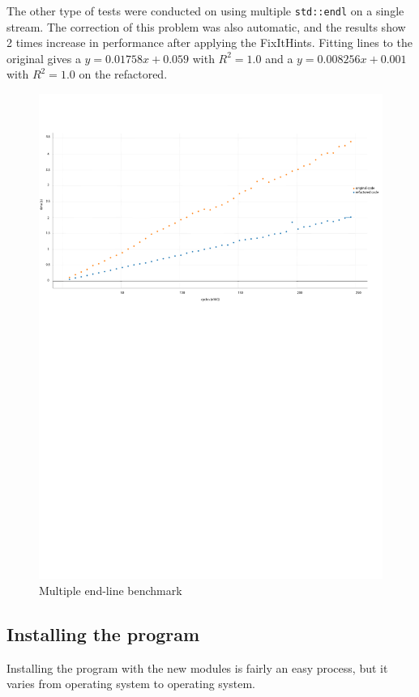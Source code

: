 \par The other type of tests were conducted on using multiple \verb|std::endl| on a single stream. The correction of this problem was also automatic, and the results show 2 times increase in performance after applying the FixItHints. Fitting lines to the original gives a $y=0.01758x+0.059$ with $R^2=1.0$ and a $y=0.008256x+0.001$ with $R^2=1.0$ on the refactored.
\begin{figure}[H]
	\caption{Multiple end-line benchmark}
	\includegraphics[scale=0.7]{images/stream_endline_performance.pdf}
\end{figure}
\subsection{Installing the program}
Installing the program with the new modules is fairly an easy process, but it varies from operating system to operating system.

